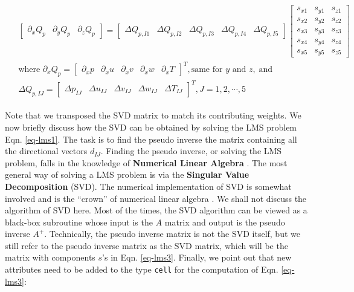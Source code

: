 \documentclass[12pt, letterpaper]{report}
\begin{document}
\begin{align}\label{eq-lms3}
   \begin{split}
   &\begin{bmatrix}\partial_x Q_{p} &\partial_y Q_{p} &\partial_z Q_{p}\end{bmatrix} = 
   \begin{bmatrix}\Delta Q_{p,I1} &\Delta Q_{p,I2} &\Delta Q_{p,I3} &\Delta Q_{p,I4} &\Delta
      Q_{p,I5}\end{bmatrix}
   \begin{bmatrix}
      s_{x1} & s_{y1} & s_{z1} \\
      s_{x2} & s_{y2} & s_{z2} \\
      s_{x3} & s_{y3} & s_{z3} \\
      s_{x4} & s_{y4} & s_{z4} \\
      s_{x5} & s_{y5} & s_{z5}
   \end{bmatrix} \\
    &\textrm{where } \partial_x Q_p = \begin{bmatrix}\partial_x p &\partial_x u &\partial_x v
    &\partial_x w &\partial_x T \end{bmatrix}^T, \textrm{same for } y \textrm{ and } z, \; \textrm{
    and}\\ &\Delta Q_{p,IJ} = \begin{bmatrix}\Delta p_{IJ} &\Delta u_{IJ} &\Delta v_{IJ} &\Delta
    w_{IJ} &\Delta T_{IJ}\end{bmatrix}^T, J = 1,2,\cdots,5
   \end{split}
\end{align}

Note that we transposed the SVD matrix to match its contributing weights. We now briefly discuss how
the SVD can be obtained by solving the LMS problem Eqn. \ref{eq-lms1}. The task is to find the
pseudo inverse the matrix containing all the directional vectors $d_{IJ}$. Finding the pseudo
inverse, or solving the LMS problem, falls in the knowledge of {\bf Numerical Linear Algebra}
\cite{trefethen1997numerical}. The most general way of solving a LMS problem is via the {\bf
Singular Value Decomposition} (SVD). The numerical implementation of SVD is somewhat involved and is
the ``crown'' of numerical linear algebra \cite{golub2013matrix}. We shall not discuss the algorithm
of SVD here. Most of the times, the SVD algorithm can be viewed as a black-box subroutine whose
input is the $A$ matrix and output is the pseudo inverse $A^+$. Technically, the pseudo inverse
matrix is not the SVD itself, but we still refer to the pseudo inverse matrix as the SVD matrix,
which will be the matrix with components $s$'s in Eqn. \ref{eq-lms3}. Finally, we point out that
new attributes need to be added to the type \verb+cell+ for the computation of Eqn. \ref{eq-lms3}:
\end{document}
